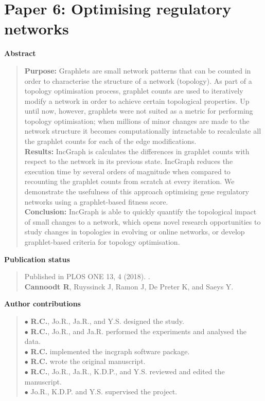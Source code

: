 \documentclass[10pt]{book}
\renewcommand{\chaptermark}[1]{\markboth{#1}{}}
\begin{document}
\vfill

\newpage
\graphicspath{{./ch6_bred/}}


\newpage{\thispagestyle{empty}\cleardoublepage}
\chapter{Paper 6: Optimising regulatory networks} 
\chaptermark{Paper 6: Optimising regulatory networks.} %
\label{chap:incgraph}


{\large \textbf{Abstract}}
\begin{quote}
	\textbf{Purpose:} Graphlets are small network patterns that can be counted in order to characterise the structure of a network (topology). As part of a topology optimisation process, graphlet counts are used to iteratively modify a network in order to achieve certain topological properties.
	Up until now, however, graphlets were not suited as a metric for performing topology optimisation; when millions of minor changes are made to the network structure it becomes computationally intractable to recalculate all the graphlet counts for each of the edge modifications. \\
	\textbf{Results:} IncGraph is calculates the differences in graphlet counts with respect to the network in its previous state.
	IncGraph reduces the execution time by several orders of magnitude when compared to recounting the graphlet counts from scratch at every iteration.
	We demonstrate the usefulness of this approach optimising gene regulatory networks using a graphlet-based fitness score. \\
	\textbf{Conclusion:} IncGraph is able to quickly quantify the topological impact of small changes to a network, which opens novel research opportunities to study changes in topologies in evolving or online networks, or develop graphlet-based criteria for topology optimisation.
\end{quote}

\vfill
{\large \textbf{Publication status}}
\begin{quote}
	Published in PLOS ONE 13, 4 (2018). . \\
	\textbf{Cannoodt R}, Ruyssinck J, Ramon J, De Preter K, and Saeys Y. 
\end{quote}

\vfill
{\large \textbf{Author contributions}}
\begin{quote}
	$\bullet$ \textbf{R.C.}, Jo.R., Ja.R., and Y.S. designed the study.\\
	$\bullet$ \textbf{R.C.}, Jo.R., and Ja.R. performed the experiments and analysed the data.\\
	$\bullet$ \textbf{R.C.} implemented the incgraph software package.\\
	$\bullet$ \textbf{R.C.} wrote the original manuscript.\\
	$\bullet$ \textbf{R.C.}, Jo.R., Ja.R., K.D.P., and Y.S. reviewed and edited the manuscript. \\
	$\bullet$ Jo.R., K.D.P. and Y.S. supervised the project.
\end{quote}
\end{document}
